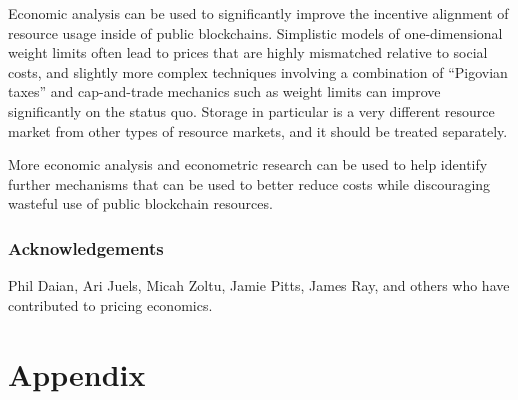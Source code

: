 \documentclass[12pt, final]{article}
\begin{document}
Economic analysis can be used to significantly improve the incentive alignment of resource usage inside of public blockchains. Simplistic models of one-dimensional weight limits often lead to prices that are highly mismatched relative to social costs, and slightly more complex techniques involving a combination of ``Pigovian taxes'' and cap-and-trade mechanics such as weight limits can improve significantly on the status quo. Storage in particular is a very different resource market from other types of resource markets, and it should be treated separately.

More economic analysis and econometric research can be used to help identify further mechanisms that can be used to better reduce costs while discouraging wasteful use of public blockchain resources.

\section{Acknowledgements}

Phil Daian, Ari Juels, Micah Zoltu, Jamie Pitts, James Ray, and others who have contributed to pricing economics.





\newpage
\appendix
\part*{Appendix}







\end{document}
